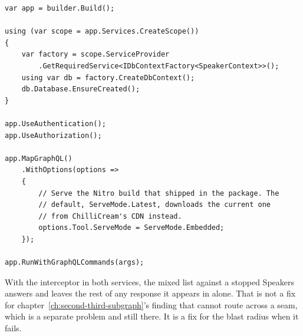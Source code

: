 \begin{verbatim}
var app = builder.Build();

using (var scope = app.Services.CreateScope())
{
    var factory = scope.ServiceProvider
        .GetRequiredService<IDbContextFactory<SpeakerContext>>();
    using var db = factory.CreateDbContext();
    db.Database.EnsureCreated();
}

app.UseAuthentication();
app.UseAuthorization();

app.MapGraphQL()
    .WithOptions(options =>
    {
        // Serve the Nitro build that shipped in the package. The
        // default, ServeMode.Latest, downloads the current one
        // from ChilliCream's CDN instead.
        options.Tool.ServeMode = ServeMode.Embedded;
    });

app.RunWithGraphQLCommands(args);
\end{verbatim}

%
With the interceptor in both services, the mixed list against a stopped
Speakers answers  and leaves the rest of any response it
appears in alone. That is not a fix for
chapter~\ref{ch:second-third-subgraph}'s finding that  cannot
route across a seam, which is a separate problem and still there. It is a fix
for the blast radius when it fails.
%
